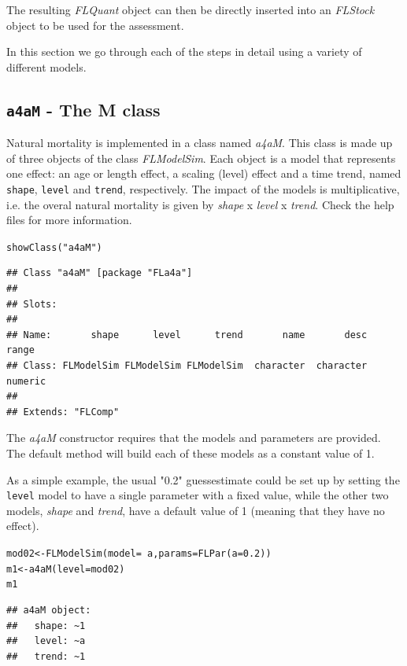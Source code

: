 \documentclass[a4paper,english,10pt]{article}\usepackage[]{graphicx}\usepackage[]{color}
\makeatletter
\newcommand{\hlnum}[1]{\textcolor[rgb]{0.2,0.2,0.2}{#1}}%
\newcommand{\hlstr}[1]{\textcolor[rgb]{0.2,0.2,0.2}{#1}}%
\newcommand{\hlopt}[1]{\textcolor[rgb]{0.2,0.2,0.2}{#1}}%
\newcommand{\hlstd}[1]{\textcolor[rgb]{0,0,0}{#1}}%
\newcommand{\hlkwb}[1]{\textcolor[rgb]{0.361,0.506,0.596}{#1}}%
\newcommand{\hlkwc}[1]{\textcolor[rgb]{0.361,0.506,0.596}{#1}}%
\newcommand{\hlkwd}[1]{\textcolor[rgb]{0.361,0.506,0.596}{#1}}%
\newenvironment{kframe}{%
 \def\at@end@of@kframe{}%
 \ifinner\ifhmode%
  \def\at@end@of@kframe{\end{minipage}}%
  \begin{minipage}{\columnwidth}%
 \fi\fi%
 \def\FrameCommand##1{\hskip\@totalleftmargin \hskip-\fboxsep
 \colorbox{shadecolor}{##1}\hskip-\fboxsep
     \hskip-\linewidth \hskip-\@totalleftmargin \hskip\columnwidth}%
 \MakeFramed {\advance\hsize-\width
   \@totalleftmargin\z@ \linewidth\hsize
   \@setminipage}}%
 {\par\unskip\endMakeFramed%
 \at@end@of@kframe}
\newenvironment{knitrout}{}{} %
\newcommand{\code}[1]{{\texttt{#1}}}
\newcommand{\class}[1]{{\textit{#1}}}
\makeatother
\begin{document}
The resulting \class{FLQuant} object can then be directly inserted into an \class {FLStock} object to be used for the assessment.   

In this section we go through each of the steps in detail using a variety of different models.

\subsection{\code{a4aM} - The M class}

Natural mortality is implemented in a class named \class{a4aM}. This class is made up of three objects of the class \class{FLModelSim}. Each object is a model that represents one effect: an age or length effect, a scaling (level) effect and a time trend, named \code{shape}, \code{level} and \code{trend}, respectively. The impact of the models is multiplicative, i.e. the overal natural mortality is given by \class{shape} x  \class{level} x \class{trend}. Check the help files for more information.

\begin{knitrout}
\color{fgcolor}\begin{kframe}
\begin{alltt}
\hlkwd{showClass}\hlstd{(}\hlstr{"a4aM"}\hlstd{)}
\end{alltt}
\begin{verbatim}
## Class "a4aM" [package "FLa4a"]
## 
## Slots:
##                                                                         
## Name:       shape      level      trend       name       desc      range
## Class: FLModelSim FLModelSim FLModelSim  character  character    numeric
## 
## Extends: "FLComp"
\end{verbatim}
\end{kframe}
\end{knitrout}

The \class{a4aM} constructor requires that the models and parameters are provided. The default method will build each of these models as a constant value of 1.

As a simple example, the usual "0.2" guessestimate could be set up by setting the \code{level} model to have a single parameter with a fixed value, while the other two models, \class{shape} and \class{trend}, have a default value of 1 (meaning that they have no effect).

\begin{knitrout}
\color{fgcolor}\begin{kframe}
\begin{alltt}
\hlstd{mod02} \hlkwb{<-} \hlkwd{FLModelSim}\hlstd{(}\hlkwc{model}\hlstd{=}\hlopt{~}\hlstd{a,} \hlkwc{params}\hlstd{=}\hlkwd{FLPar}\hlstd{(}\hlkwc{a}\hlstd{=}\hlnum{0.2}\hlstd{))}
\hlstd{m1} \hlkwb{<-} \hlkwd{a4aM}\hlstd{(}\hlkwc{level}\hlstd{=mod02)}
\hlstd{m1}
\end{alltt}
\begin{verbatim}
## a4aM object:
##   shape: ~1
##   level: ~a
##   trend: ~1
\end{verbatim}
\end{kframe}
\end{knitrout}
\end{document}
